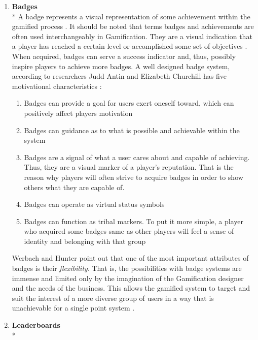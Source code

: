 \begin{enumerate}
\item \textbf{Badges}\\*
A badge represents a visual representation of some achievement within the gamified process \cite{WerbachCoursera, werbach2012win}. It should be noted that terms badges and achievements are often used interchangeably in
Gamification. They are a visual indication that a player has reached a certain level or accomplished some set of objectives \cite{werbach2012win, zichermann2011gamification}. When acquired, badges can serve a success indicator and, thus, possibly inspire players to achieve more badges. A well designed badge system, according to researchers Judd Antin and Elizabeth Churchill has five motivational characteristics \cite{werbach2012win}:
\begin{enumerate}
\item Badges can provide a goal for users exert oneself toward, which can positively affect players motivation
\item Badges can guidance as to what is possible and achievable within the system 
\item Badges are a signal of what a user cares about and capable of achieving. Thus, they are a visual marker of a player's reputation. That is the reason why players will often strive to acquire badges in order to show
others what they are capable of.
\item Badges can operate as virtual status symbols 
\item Badges can function as tribal markers. To put it more simple, a player who acquired some badges same as other players will feel a sense of identity and belonging with that group
\end{enumerate}
Werbach and Hunter point out that one of the most important attributes of badges is their \textit{flexibility}. That is, the possibilities with badge systems are immense and limited only by the imagination of the Gamification designer and the needs of the business. This allows the gamified system to target and suit the interest of a more diverse group of users in a way that is unachievable for a single point system \cite{werbach2012win}. 
\item \textbf{Leaderboards}\\*

\end{enumerate}
